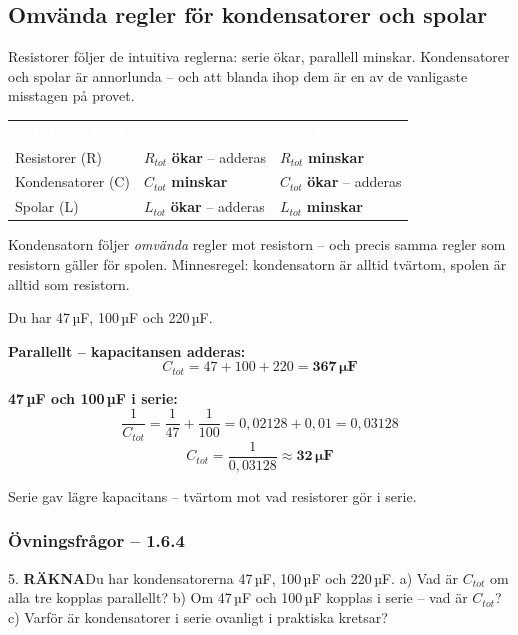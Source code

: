 \documentclass[a4paper,11pt,twoside]{book}
\newcommand{\tblhdr}[1]{\cellcolor{greydark}\textcolor{white}{\headingfont\bfseries\footnotesize\MakeUppercase{#1}}}
\newcommand{\qrakna}{\colorbox{bluepale}{\textcolor{bluedark}{\headingfont\bfseries\tiny RÄKNA}}}
\begin{document}
\subsection{Omvända regler för kondensatorer och spolar}

Resistorer följer de intuitiva reglerna: serie ökar, 
parallell minskar. Kondensatorer och spolar är 
annorlunda -- och att blanda ihop dem är en av de 
vanligaste misstagen på provet.

\begin{center}
\begin{tabular}{L{2.8cm}L{4.2cm}L{4.2cm}}
\tblhdr{Komponent} & \tblhdr{Serie} & \tblhdr{Parallell} \\
Resistorer (R) & $R_{tot}$ \textbf{ökar} -- adderas & $R_{tot}$ \textbf{minskar} \\
Kondensatorer (C) & $C_{tot}$ \textbf{minskar} & $C_{tot}$ \textbf{ökar} -- adderas \\
Spolar (L) & $L_{tot}$ \textbf{ökar} -- adderas & $L_{tot}$ \textbf{minskar} \\
\end{tabular}
\end{center}

Kondensatorn följer \emph{omvända} regler mot 
resistorn -- och precis samma regler som resistorn 
gäller för spolen. Minnesregel: kondensatorn är alltid 
tvärtom, spolen är alltid som resistorn.

\begin{worked}[title={Räkneexempel 1.6.4 -- Kondensatorer i serie och parallellt}]
Du har 47\,µF, 100\,µF och 220\,µF.

\textbf{Parallellt -- kapacitansen adderas:}
\[ C_{tot} = 47 + 100 + 220 = \mathbf{367\,\mu\text{F}} \]

\textbf{47\,µF och 100\,µF i serie:}
\[ \frac{1}{C_{tot}} = \frac{1}{47} + \frac{1}{100} = 0{,}02128 + 0{,}01 = 0{,}03128 \]
\[ C_{tot} = \frac{1}{0{,}03128} \approx \mathbf{32\,\mu\text{F}} \]

Serie gav lägre kapacitans -- tvärtom mot vad 
resistorer gör i serie.
\end{worked}

\subsubsection*{Övningsfrågor -- 1.6.4}

\begin{qblock}{5.}
\qrakna\quad Du har kondensatorerna 47\,µF, 100\,µF 
och 220\,µF. 
a) Vad är $C_{tot}$ om alla tre kopplas parallellt? 
b) Om 47\,µF och 100\,µF kopplas i serie -- vad är 
$C_{tot}$? 
c) Varför är kondensatorer i serie ovanligt i 
praktiska kretsar?
\end{qblock}
\end{document}
